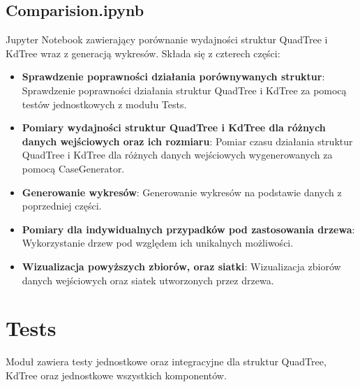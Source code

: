 \documentclass{lab}
\begin{document}
\subsection{Comparision.ipynb}
Jupyter Notebook zawierający porównanie wydajności struktur QuadTree i KdTree wraz z generacją wykresów. Składa się z czterech części:
\begin{itemize}
  \item \textbf{Sprawdzenie poprawności działania porównywanych struktur}:
  Sprawdzenie poprawności działania struktur QuadTree i KdTree za pomocą testów jednostkowych z modułu Tests.
  \item \textbf{Pomiary wydajności struktur QuadTree i KdTree dla różnych danych wejściowych oraz ich rozmiaru}:
  Pomiar czasu działania struktur QuadTree i KdTree dla różnych danych wejściowych wygenerowanych za pomocą CaseGenerator.
  \item \textbf{Generowanie wykresów}:
  Generowanie wykresów na podstawie danych z poprzedniej części.
  \item \textbf{Pomiary dla indywidualnych przypadków pod zastosowania drzewa}:
  Wykorzystanie drzew pod względem ich unikalnych możliwości.
  \item \textbf{Wizualizacja powyższych zbiorów, oraz siatki}:
  Wizualizacja zbiorów danych wejściowych oraz siatek utworzonych przez drzewa.
\end{itemize}

\section{Tests}
Moduł zawiera testy jednostkowe oraz integracyjne dla struktur QuadTree, KdTree oraz jednostkowe wszystkich komponentów.
\end{document}
